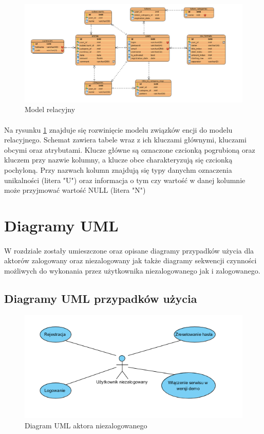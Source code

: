 \documentclass{article}
\begin{document}
	\begin{figure}[H]
		\centering
		\includegraphics[width=1\linewidth]{assets/rel.png}
		\caption[]{Model relacyjny}
		\label{fig:rel}
	\end{figure}

	\paragraph{} Na rysunku \ref{fig:rel} znajduje się rozwinięcie modelu związków encji do modelu relacyjnego. Schemat zawiera tabele wraz z ich kluczami głównymi, kluczami obcymi oraz atrybutami. Klucze główne są oznaczone czcionką pogrubioną oraz kluczem przy nazwie kolumny, a klucze obce charakteryzują się czcionką pochyloną. Przy nazwach kolumn znajdują się typy danychm oznaczenia unikalności (litera "U") oraz informacja o tym czy wartość w danej kolumnie może przyjmować wartość NULL (litera "N")

	\section{Diagramy UML}
	\paragraph*{} W rozdziale zostały umieszczone oraz opisane diagramy przypadków użycia dla aktorów zalogowany oraz niezalogowany jak także diagramy sekwencji czynności możliwych do wykonania przez użytkownika niezalogowanego jak i zalogowanego.
	\subsection{Diagramy UML przypadków użycia}
	\begin{figure}[h]
		\centering
		\includegraphics[scale=0.9]{assets/uml1.png}
		\caption[]{Diagram UML aktora niezalogowanego}
		\label{fig:niezalakt}
	\end{figure}
\end{document}

